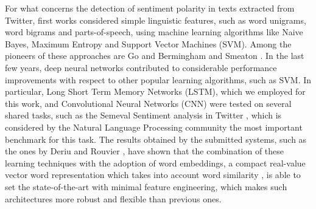 For what concerns the detection of sentiment polarity in texts extracted from Twitter, first works considered simple linguistic features, such as word unigrams, word bigrams and parts-of-speech, using machine learning algorithms like Naive Bayes, Maximum Entropy and Support Vector Machines (SVM). Among the pioneers of these approaches are Go \etal \cite{go2009twitter} and Bermingham and Smeaton \cite{bermingham2010classifying}.
In the last few years, deep neural networks contributed to considerable performance improvements with respect to other popular learning algorithms, such as SVM. In particular, Long Short Term Memory Networks (LSTM), which we employed for this
work, and Convolutional Neural Networks (CNN) were tested on several shared tasks, such as the Semeval Sentiment analysis in Twitter \cite{nakov2016semeval}, which is
considered by the Natural Language Processing community the most
important benchmark for this task. The results obtained by the
submitted systems, such as the ones by Deriu \etal
\cite{deriu2016swisscheese} and Rouvier \etal \cite{rouvier2016sensei}, have
shown that the combination of these learning techniques with the
adoption of word embeddings, a compact real-value vector word
representation which takes into account word similarity
\cite{mikolov2013distributed,pennington2014glove}, is able to set the
state-of-the-art with minimal feature engineering,
which makes such architectures more robust and flexible than previous ones. %

